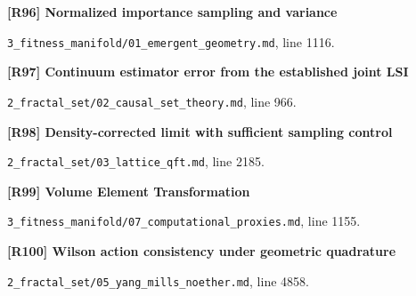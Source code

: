 \documentclass[11pt,a4paper]{article}
\begin{document}
\par\medskip\noindent\begin{minipage}{\linewidth}\textbf{[R96] Normalized importance sampling and variance}\label{src:prop-monte-carlo-riemannian-latent}\par
{\small\texttt{}\par
\nolinkurl{3_fitness_manifold/01_emergent_geometry.md}, line 1116.\par}
\end{minipage}\par

\par\medskip\noindent\begin{minipage}{\linewidth}\textbf{[R97] Continuum estimator error from the established joint LSI}\label{src:cor-cst-inherited-lsi-consistency}\par
{\small\texttt{}\par
\nolinkurl{2_fractal_set/02_causal_set_theory.md}, line 966.\par}
\end{minipage}\par

\par\medskip\noindent\begin{minipage}{\linewidth}\textbf{[R98] Density-corrected limit with sufficient sampling control}\label{src:prop-density-corrected-limit}\par
{\small\texttt{}\par
\nolinkurl{2_fractal_set/03_lattice_qft.md}, line 2185.\par}
\end{minipage}\par

\par\medskip\noindent\begin{minipage}{\linewidth}\textbf{[R99] Volume Element Transformation}\label{src:thm-volume-element-transformation}\par
{\small\texttt{}\par
\nolinkurl{3_fitness_manifold/07_computational_proxies.md}, line 1155.\par}
\end{minipage}\par

\par\medskip\noindent\begin{minipage}{\linewidth}\textbf{[R100] Wilson action consistency under geometric quadrature}\label{src:thm-continuum-limit-ym}\par
{\small\texttt{}\par
\nolinkurl{2_fractal_set/05_yang_mills_noether.md}, line 4858.\par}
\end{minipage}\par
\end{document}
